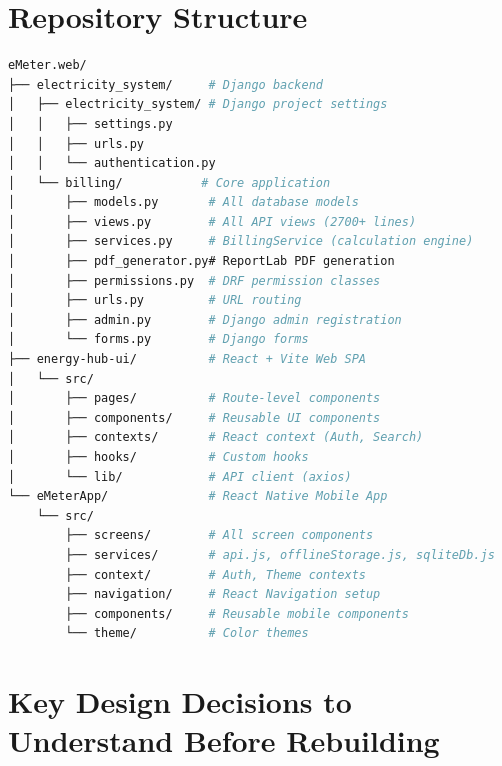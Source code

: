 \documentclass[12pt, a4paper]{report}
\begin{document}
\section{Repository Structure}

\begin{lstlisting}[language=bash]
eMeter.web/
├── electricity_system/     # Django backend
│   ├── electricity_system/ # Django project settings
│   │   ├── settings.py
│   │   ├── urls.py
│   │   └── authentication.py
│   └── billing/           # Core application
│       ├── models.py       # All database models
│       ├── views.py        # All API views (2700+ lines)
│       ├── services.py     # BillingService (calculation engine)
│       ├── pdf_generator.py# ReportLab PDF generation
│       ├── permissions.py  # DRF permission classes
│       ├── urls.py         # URL routing
│       ├── admin.py        # Django admin registration
│       └── forms.py        # Django forms
├── energy-hub-ui/          # React + Vite Web SPA
│   └── src/
│       ├── pages/          # Route-level components
│       ├── components/     # Reusable UI components
│       ├── contexts/       # React context (Auth, Search)
│       ├── hooks/          # Custom hooks
│       └── lib/            # API client (axios)
└── eMeterApp/              # React Native Mobile App
    └── src/
        ├── screens/        # All screen components
        ├── services/       # api.js, offlineStorage.js, sqliteDb.js
        ├── context/        # Auth, Theme contexts
        ├── navigation/     # React Navigation setup
        ├── components/     # Reusable mobile components
        └── theme/          # Color themes
\end{lstlisting}

\section{Key Design Decisions to Understand Before Rebuilding}
\end{document}
